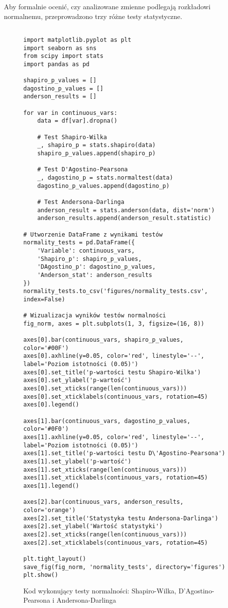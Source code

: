\documentclass[12pt,a4paper]{article}
\newcommand{\kod}[2]{
    \begin{figure}[H]
        \begin{lstlisting}[style=pythonstyle]
#1
        \end{lstlisting}
        \caption{#2}
    \end{figure}
}
\begin{document}
Aby formalnie ocenić, czy analizowane zmienne podlegają rozkładowi normalnemu, przeprowadzono trzy różne testy statystyczne.

\kod{
import matplotlib.pyplot as plt
import seaborn as sns
from scipy import stats
import pandas as pd

shapiro_p_values = []
dagostino_p_values = []
anderson_results = []

for var in continuous_vars:
    data = df[var].dropna()
    
    # Test Shapiro-Wilka
    _, shapiro_p = stats.shapiro(data)
    shapiro_p_values.append(shapiro_p)
    
    # Test D'Agostino-Pearsona
    _, dagostino_p = stats.normaltest(data)
    dagostino_p_values.append(dagostino_p)
    
    # Test Andersona-Darlinga
    anderson_result = stats.anderson(data, dist='norm')
    anderson_results.append(anderson_result.statistic)

# Utworzenie DataFrame z wynikami testów
normality_tests = pd.DataFrame({
    'Variable': continuous_vars,
    'Shapiro_p': shapiro_p_values,
    'DAgostino_p': dagostino_p_values,
    'Anderson_stat': anderson_results
})
normality_tests.to_csv('figures/normality_tests.csv', index=False)

# Wizualizacja wyników testów normalności
fig_norm, axes = plt.subplots(1, 3, figsize=(16, 8))

axes[0].bar(continuous_vars, shapiro_p_values, color='#00F')
axes[0].axhline(y=0.05, color='red', linestyle='--', label='Poziom istotności (0.05)')
axes[0].set_title('p-wartości testu Shapiro-Wilka')
axes[0].set_ylabel('p-wartość')
axes[0].set_xticks(range(len(continuous_vars)))
axes[0].set_xticklabels(continuous_vars, rotation=45)
axes[0].legend()

axes[1].bar(continuous_vars, dagostino_p_values, color='#0F0')
axes[1].axhline(y=0.05, color='red', linestyle='--', label='Poziom istotności (0.05)')
axes[1].set_title('p-wartości testu D\'Agostino-Pearsona')
axes[1].set_ylabel('p-wartość')
axes[1].set_xticks(range(len(continuous_vars)))
axes[1].set_xticklabels(continuous_vars, rotation=45)
axes[1].legend()

axes[2].bar(continuous_vars, anderson_results, color='orange')
axes[2].set_title('Statystyka testu Andersona-Darlinga')
axes[2].set_ylabel('Wartość statystyki')
axes[2].set_xticks(range(len(continuous_vars)))
axes[2].set_xticklabels(continuous_vars, rotation=45)

plt.tight_layout()
save_fig(fig_norm, 'normality_tests', directory='figures')
plt.show()
}{Kod wykonujący testy normalności: Shapiro-Wilka, D'Agostino-Pearsona i Andersona-Darlinga}
\end{document}
